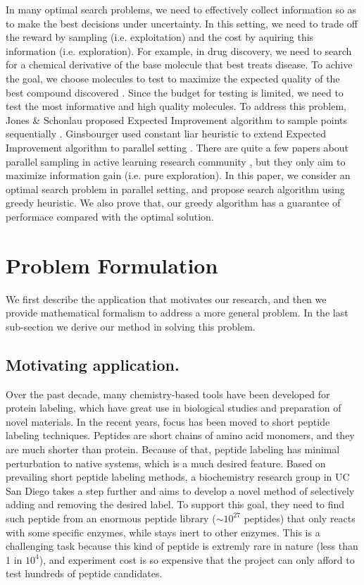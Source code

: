\documentclass[opre,nonblindrev]{informs3} %
\begin{document}
In many optimal search problems, we need to effectively collect information so as to make the best decisions under uncertainty. In this setting, we need to trade off the reward by sampling (i.e. exploitation) and the cost by aquiring this information (i.e. exploration). For example, in drug discovery, we need to search for a chemical derivative of the base molecule that best treats disease. To achive the goal, we choose molecules to test  to maximize the expected quality of the
best compound discovered \citep{Negoescu2010}. Since the budget for testing is limited, we need to test the most informative and high quality molecules. To address this problem, Jones \& Schonlau proposed Expected Improvement algorithm to sample points sequentially \citep{Jones1998} . Ginsbourger used constant liar heuristic to extend Expected Improvement algorithm to parallel setting \citep{Ginsbourger2008} . There are quite a few papers about parallel sampling in active learning research
community \citep{Chen2013, Hoi2006, Hoi2006a} , but they only aim to maximize information gain (i.e. pure exploration). In this paper, we consider an optimal search problem in parallel setting, and propose search algorithm using greedy heuristic. We also prove that, our greedy algorithm has a guarantee of performace compared with the optimal solution.

\section{Problem Formulation}

We first describe the application that motivates our research, and then we provide mathematical formalism to address a more general problem. In the last sub-section we derive our method in solving this problem.

\subsection{Motivating application.} \label{sec: motivate app}
Over the past decade, many chemistry-based tools have been developed for protein labeling, which have great use in biological studies and preparation of novel materials. In the recent years, focus has been moved to short peptide labeling techniques. Peptides are short chains of amino acid monomers, and they are much shorter than protein. Because of that, peptide labeling has minimal perturbation to native systems, which is a much desired feature.  Based on prevailing short peptide
labeling methods, a biochemistry research group in UC San Diego takes a step further and aims to develop a novel method of selectively adding and removing the desired label. To support this goal, they need to find such peptide from an enormous peptide library ($\sim 10^{27}$ peptides) that only reacts with some specific enzymes, while stays inert to other enzymes. This is a challenging task because this kind of peptide is extremly rare in nature (less than 1 in $10^4$), and experiment cost
is so expensive that the project can only afford to test hundreds of peptide candidates.
\end{document}
